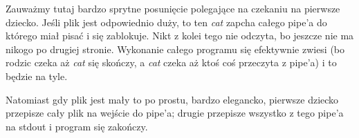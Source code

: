Zauważmy tutaj bardzo sprytne posunięcie polegające na czekaniu na pierwsze dziecko. Jeśli plik jest odpowiednio duży, to ten \textit{cat} zapcha całego pipe'a do którego miał pisać i się zablokuje. Nikt z kolei tego nie odczyta, bo jeszcze nie ma nikogo po drugiej stronie. Wykonanie całego programu się efektywnie zwiesi (bo rodzic czeka aż \textit{cat} się skończy, a \textit{cat} czeka aż ktoś coś przeczyta z pipe'a) i to będzie na tyle.

Natomiast gdy plik jest mały to po prostu, bardzo elegancko, pierwsze dziecko przepisze cały plik na wejście do pipe'a; drugie przepisze wszystko z tego pipe'a na stdout i program się zakończy. 